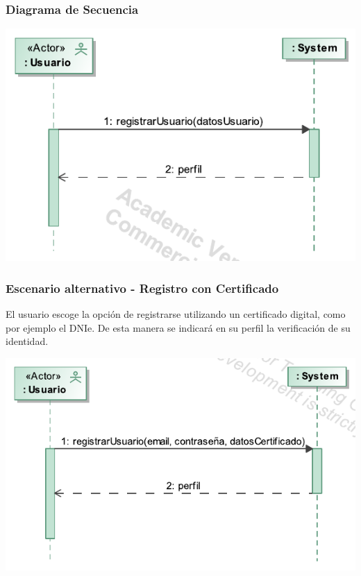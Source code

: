 \documentclass[12pt, a4paper, titlepage]{article}
\begin{document}
\subsubsection{Diagrama de Secuencia}
\begin{center}
	\includegraphics[width=\textwidth]{Imagenes/registrarUsuario}
\end{center}

\subsubsection{Escenario alternativo - Registro con Certificado}
El usuario escoge la opción de registrarse utilizando un certificado digital, como por ejemplo el DNIe. De esta manera se indicará en su perfil la verificación de su identidad.
\begin{center}
	\includegraphics[width=\textwidth]{Imagenes/registrarUsuarioAlt}
\end{center}
\end{document}
